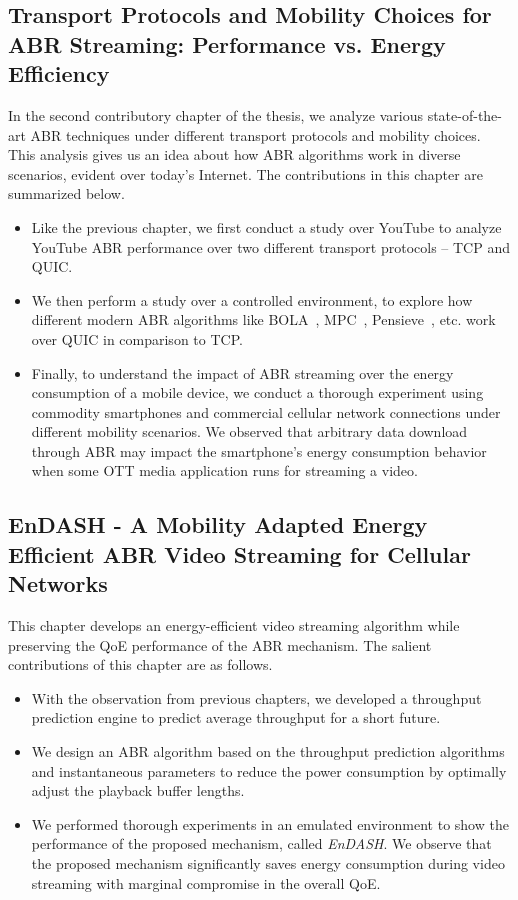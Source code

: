 \subsection{Transport Protocols and Mobility Choices for ABR Streaming: Performance vs. Energy Efficiency}
In the second contributory chapter of the thesis, we analyze various state-of-the-art ABR techniques under different transport protocols and mobility choices. This analysis gives us an idea about how ABR algorithms work in diverse scenarios, evident over today's Internet. The contributions in this chapter are summarized below. 
\begin{itemize}
	\item Like the previous chapter, we first conduct a study over YouTube to analyze YouTube ABR performance over two different transport protocols -- TCP and QUIC.
	\item We then perform a study over a controlled environment, to explore how different modern ABR algorithms like BOLA~\cite{Spiteri2016}, MPC~\cite{yin2015control}, Pensieve~\cite{mao2017neural}, etc. work over QUIC in comparison to TCP.
	\item Finally, to understand the impact of ABR streaming over the energy consumption of a mobile device, we conduct a thorough experiment using commodity smartphones and commercial cellular network connections under different mobility scenarios. We observed that arbitrary data download through ABR may impact the smartphone's energy consumption behavior when some OTT media application runs for streaming a video. 
\end{itemize}

\subsection{EnDASH - A Mobility Adapted Energy Efficient ABR Video Streaming for Cellular Networks}
This chapter develops an energy-efficient video streaming algorithm while preserving the QoE performance of the ABR mechanism. The salient contributions of this chapter are as follows. 
\begin{itemize}
	\item With the observation from previous chapters, we developed a throughput prediction engine to predict average throughput for a short future.
	\item We design an ABR algorithm based on the throughput prediction algorithms and instantaneous parameters to reduce the power consumption by optimally adjust the playback buffer lengths.
	\item We performed thorough experiments in an emulated environment to show the performance of the proposed mechanism, called \textit{EnDASH}. We observe that the proposed mechanism significantly saves energy consumption during video streaming with marginal compromise in the overall QoE. 
\end{itemize}

